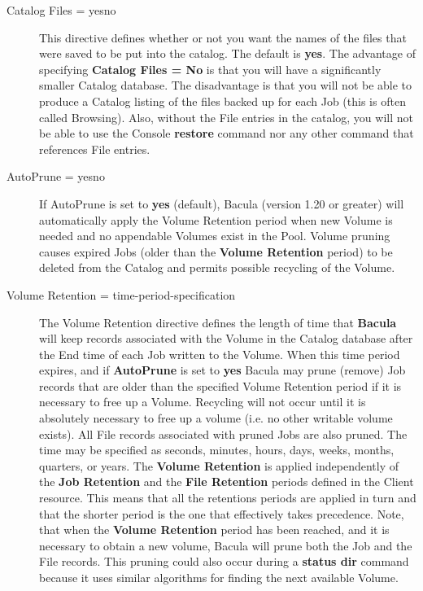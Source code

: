 \begin{description}
\item [Catalog Files = \lt{}yes\vb{}no\gt{}]
   This directive defines whether or not you want the names of the files
   that were saved to be put into the catalog.  The default is {\bf yes}.
   The advantage of specifying {\bf Catalog Files = No} is that you will
   have a significantly smaller Catalog database.  The disadvantage is that
   you will not be able to produce a Catalog listing of the files backed up
   for each Job (this is often called Browsing).  Also, without the File
   entries in the catalog, you will not be able to use the Console {\bf
   restore} command nor any other command that references File entries.
   
\label{PoolAutoPrune}
\item [AutoPrune = \lt{}yes\vb{}no\gt{}]
   If AutoPrune is set to {\bf yes} (default), Bacula (version 1.20 or
   greater) will automatically apply the Volume Retention period when new
   Volume is needed and no appendable Volumes exist in the Pool.  Volume
   pruning causes expired Jobs (older than the {\bf Volume Retention}
   period) to be deleted from the Catalog and permits possible recycling of
   the Volume.
   
\label{VolRetention}
\item [Volume Retention = \lt{}time-period-specification\gt{}]
   The Volume Retention directive defines the length of time that {\bf
   Bacula} will keep records associated with the Volume in
   the Catalog database after the End time of each Job written to the
   Volume.  When this time period expires, and if {\bf AutoPrune} is set to
   {\bf yes} Bacula may prune (remove) Job records that are older than the
   specified Volume Retention period if it is necessary to free up a
   Volume.  Recycling will not occur until it is absolutely necessary to
   free up a volume (i.e. no other writable volume exists).
   All File records associated with pruned Jobs are also
   pruned.  The time may be specified as seconds, minutes, hours, days,
   weeks, months, quarters, or years.  The {\bf Volume Retention} is
   applied independently of the {\bf Job Retention} and the {\bf File
   Retention} periods defined in the Client resource.  This means that all
   the retentions periods are applied in turn and that the shorter period
   is the one that effectively takes precedence.  Note, that when the {\bf
   Volume Retention} period has been reached, and it is necessary to obtain
   a new volume, Bacula will prune both the Job and the File records.  This
   pruning could also occur during a {\bf status dir} command because it
   uses similar algorithms for finding the next available Volume.


\end{description}
